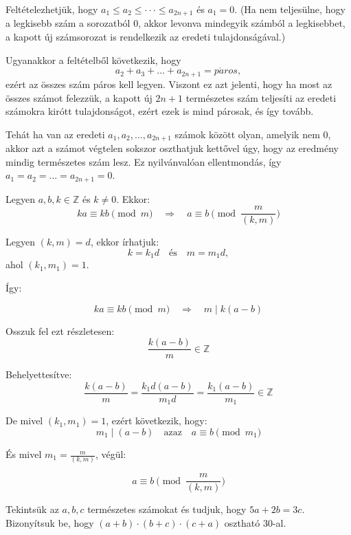 \begin{solution}
Feltételezhetjük, hogy $a_{1}\leq a_{2}\leq\cdot\cdot\cdot\leq a_{2n+1}$
és $a_{1}=0$. (Ha nem teljesülne, hogy a legkisebb szám a sorozatból
$0$, akkor levonva mindegyik számból a legkisebbet, a kapott új számsorozat
is rendelkezik az eredeti tulajdonságával.)

Ugyanakkor a feltételből következik, hogy 
\[
a_{2}+a_{3}+\dots+a_{2n+1}=p\acute{a}ros,
\]
 ezért az összes szám páros kell legyen. Viszont ez azt jelenti, hogy
ha most az összes számot felezzük, a kapott új $2n+1$ természetes
szám teljesíti az eredeti számokra kirótt tulajdonságot, ezért ezek
is mind párosak, és így tovább.

Tehát ha van az eredeti $a_{1},a_{2},\dots,a_{2n+1}$ számok között
olyan, amelyik nem 0, akkor azt a számot végtelen sokszor oszthatjuk
kettővel úgy, hogy az eredmény mindig természetes szám lesz. Ez nyilvánvalóan
ellentmondás, így $a_{1}=a_{2}=\dots=a_{2n+1}=0$. 
\end{solution}
\begin{extraproblem}
Legyen $a,b,k\in\mathbb{Z}$ és $k\neq0$. Ekkor: 
\[
ka\equiv kb\pmod m\quad\Longrightarrow\quad a\equiv b\pmod{\frac{m}{(k,m)}}
\]
\end{extraproblem}

\begin{solution}
Legyen $(k,m)=d$, ekkor írhatjuk: 
\[
k=k_{1}d\quad\text{és}\quad m=m_{1}d,
\]
ahol $(k_{1},m_{1})=1$.

Így:

\[
ka\equiv kb\pmod m\quad\Longrightarrow\quad m\mid k(a-b)
\]

Osszuk fel ezt részletesen: 
\[
\frac{k(a-b)}{m}\in\mathbb{Z}
\]

Behelyettesítve: 
\[
\frac{k(a-b)}{m}=\frac{k_{1}d(a-b)}{m_{1}d}=\frac{k_{1}(a-b)}{m_{1}}\in\mathbb{Z}
\]

De mivel $(k_{1},m_{1})=1$, ezért következik, hogy: 
\[
m_{1}\mid(a-b)\quad\text{azaz}\quad a\equiv b\pmod{m_{1}}
\]

És mivel $m_{1}=\frac{m}{(k,m)}$, végül:

\[
a\equiv b\pmod{\frac{m}{(k,m)}}
\]
\end{solution}
\begin{extraproblem}
Tekintsük az $a,b,c$ természetes számokat és tudjuk, hogy $5a+2b=3c$.
Bizonyítsuk be, hogy $(a+b)\cdot(b+c)\cdot(c+a)$ osztható 30-al. 
\end{extraproblem}

